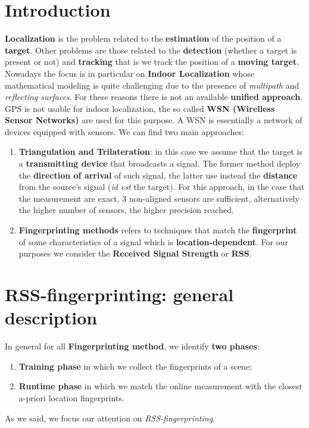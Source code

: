 \section{Introduction}
\noindent
\textbf{Localization} is the problem related to the \textbf{estimation} of the position of a \textbf{target}. Other problems are those related to the \textbf{detection} (whether a target is present or not) and \textbf{tracking} that is we track the position of a \textbf{moving target}.\\
Nowadays the focus is in particular on \textbf{Indoor Localization} whose mathematical modeling is quite challenging due to the presence of \textit{multipath} and \textit{reflecting surfaces}. For these reasons there is not an available \textbf{unified approach}. \\
GPS is not usable for indoor localization, the so called \textbf{WSN (Wirelless Sensor Networks)} are used for this purpose. A WSN is essentially a network of devices equipped  with sensors. We can find two main approaches: 
\begin{enumerate}
    \item \textbf{Triangulation and Trilateration}: in this case we assume that the target is a \textbf{transmitting device} that broadcasts a signal. The former method deploy the \textbf{direction of arrival} of such signal, the latter use instead the \textbf{distance} from the source's signal (\textit{id est} the target). For this approach, in the case that the measurement are exact, 3 non-aligned sensors are sufficient, alternatively the higher number of sensors, the higher precision reached.
    \item \textbf{Fingerprinting methods} refers to techniques that match the \textbf{fingerprint} of some characteristics of a signal which is \textbf{location-dependent}. For our purposes we consider the \textbf{Received Signal Strength} or \textbf{RSS}.
\end{enumerate}

\section{RSS-fingerprinting: general description }
In general for all \textbf{Fingerprinting method}, we identify \textbf{two phases}:
\begin{enumerate}
    \item \textbf{Training phase} in which we collect the fingerprints of a scene; 
    \item \textbf{Runtime phase} in which we match the online measurement with the closest a-priori location fingerprints.
\end{enumerate}
As we said, we focus our attention on \textit{RSS-fingerprinting}.

